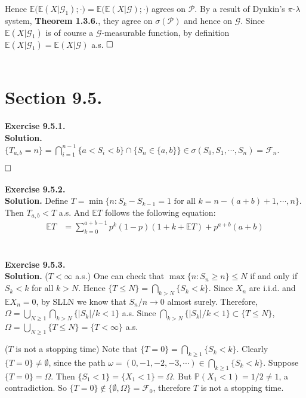 \documentclass[12pt]{extarticle}
\begin{document}
Hence $\mathbb{E}\big(\mathbb{E}(X|\mathcal{G}_1);\cdot\big)=\mathbb{E}\big(\mathbb{E}(X|\mathcal{G});\cdot)$ agrees on $\mathcal{P}$. By a result of Dynkin's $\pi$-$\lambda$ system, \textbf{Theorem 1.3.6.}, they agree on $\sigma(\mathcal{P})$ and hence on $\mathcal{G}$.  Since $\mathbb{E}(X|\mathcal{G}_1)$ is of course a $\mathcal{G}$-measurable function, by definition $\mathbb{E}(X|\mathcal{G}_1)=\mathbb{E}(X|\mathcal{G})$ a.s.
$\hspace{\fill}\square$
\\ \\
\section*{Section 9.5.}
\textbf{Exercise 9.5.1.}\\
\textbf{Solution.} $\{T_{a,b}=n\}=\bigcap_{i=1}^{n-1}\{a<S_i<b\}\cap\{S_n\in\{a,b\}\}\in\sigma(S_0,S_1,\cdots,S_n)=\mathcal{F}_n$.

$\hspace{\fill}\square$
\\ \\
\textbf{Exercise 9.5.2.} \\
\textbf{Solution.} Define $T=\min\{n:S_k-S_{k-1}=1\text{ for all $k=n-(a+b)+1,\cdots,n$}\}$. Then $T_{a,b}<T$ a.s. 
And $\mathbb{E}T$ follows the following equation:
\begin{equation*}
\begin{aligned}
\mathbb{E}T &= \sum_{k=0}^{a+b-1}p^k(1-p)(1+k+\mathbb{E}T)+p^{a+b}(a+b) 
\end{aligned}
\end{equation*}
\\ \\
\textbf{Exercise 9.5.3.}\\
\textbf{Solution.} ($T<\infty$ a.s.) One can check that $\max\{n:S_n\geq n\}\leq N$ if and only if $S_k<k$ for all $k>N$. Hence $\{T\leq N\}=\bigcap_{k>N}\{S_k<k\}$. Since $X_n$ are i.i.d. and $\mathbb{E}X_n=0$, by SLLN we know that $S_n/n\rightarrow 0$ almost surely. Therefore, $\Omega=\bigcup_{N\geq 1}\bigcap_{k>N}\{|S_k|/k<1\}$ a.s. Since $\bigcap_{k>N}\{|S_k|/k<1\}\subset\{T\leq N\}$, $\Omega=\bigcup_{N\geq 1}\{T\leq N\}=\{T<\infty\}$ a.s.

($T$ is not a stopping time) Note that $\{T=0\}=\bigcap_{k\geq 1}\{S_k<k\}$. 
Clearly $\{T=0\}\neq\emptyset$, 
since the path $\omega=(0,-1,-2,-3,\cdots)\in\bigcap_{k\geq 1}\{S_k<k\}$. 
Suppose $\{T=0\}=\Omega$. Then $\{S_1<1\}=\{X_1<1\}=\Omega$. But $\mathbb{P}(X_1<1)=1/2\neq 1$, a contradiction. So $\{T=0\}\notin\{\emptyset,\Omega\}=\mathcal{F}_0$, therefore $T$ is not a stopping time.
\end{document}
